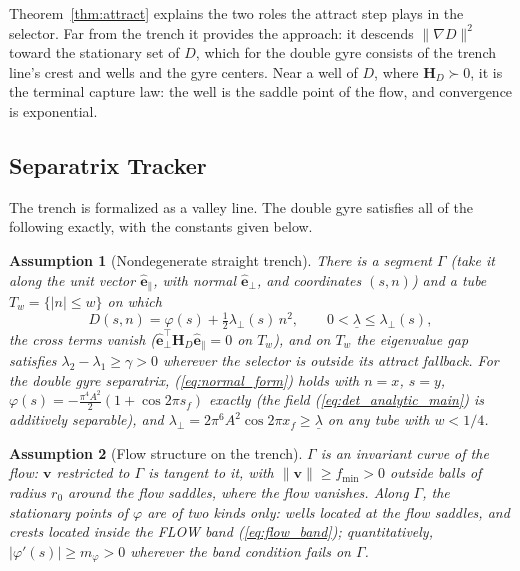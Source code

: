 \documentclass[lettersize,journal]{IEEEtran}
\newtheorem{assumption}{Assumption}
\begin{document}
Theorem~\ref{thm:attract} explains the two roles the attract step plays
in the selector. Far from the trench it provides the approach: it descends
$\|\nabla D\|^2$ toward the stationary set of $D$, which for the double
gyre consists of the trench line's crest and wells and the gyre
centers. Near a well of $D$, where $\mathbf{H}_D \succ 0$, it is the
terminal capture law: the well is the saddle point of the flow, and
convergence is exponential.

\subsection{Separatrix Tracker}
\label{sec:stab_sep}

The trench is formalized as a valley line. The double gyre satisfies all
of the following exactly, with the constants given below.

\begin{assumption}[Nondegenerate straight trench]
\label{ass:trench}
There is a segment $\Gamma$ (take it along the unit vector
$\hat{\mathbf{e}}_\parallel$, with normal $\hat{\mathbf{e}}_\perp$, and
coordinates $(s, n)$) and a tube $T_w = \{|n| \leq w\}$ on which
\begin{equation}
    D(s, n) = \varphi(s) + \tfrac{1}{2}\lambda_\perp(s)\,n^2,
    \qquad 0 < \underline{\lambda} \leq \lambda_\perp(s),
    \label{eq:normal_form}
\end{equation}
the cross terms vanish
($\hat{\mathbf{e}}_\perp^\top \mathbf{H}_D \hat{\mathbf{e}}_\parallel
= 0$ on $T_w$), and on $T_w$ the eigenvalue gap satisfies
$\lambda_2 - \lambda_1 \geq \gamma > 0$ wherever the selector is
outside its attract fallback. For the double gyre separatrix,
(\ref{eq:normal_form}) holds with $n = x$, $s = y$, $\varphi(s) =
-\tfrac{\pi^4 A^2}{2}(1 + \cos 2\pi s_f)$ exactly (the field
(\ref{eq:det_analytic_main}) is additively separable), and
$\lambda_\perp = 2\pi^6 A^2 \cos 2\pi x_f \geq \underline{\lambda}$ on
any tube with $w < 1/4$.
\end{assumption}

\begin{assumption}[Flow structure on the trench]
\label{ass:flow}
$\Gamma$ is an invariant curve of the flow: $\mathbf{v}$ restricted to
$\Gamma$ is tangent to it, with $\|\mathbf{v}\| \geq f_{\min} > 0$
outside balls of radius $r_0$ around the flow saddles, where the flow
vanishes. Along $\Gamma$, the stationary points of $\varphi$ are of two
kinds only: wells located at the flow saddles, and crests located inside
the FLOW band (\ref{eq:flow_band}); quantitatively, $|\varphi'(s)| \geq
m_\varphi > 0$ wherever the band condition fails on $\Gamma$.
\end{assumption}
\end{document}
